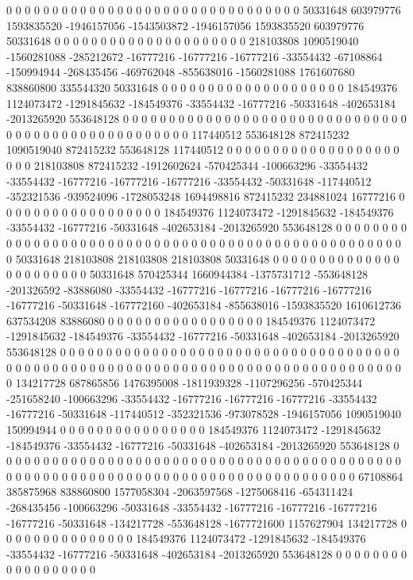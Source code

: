 0 0 0 0 0 0 0 0 0 0 0 0 0 0 0 0 0 0 0 0 0 0 0 0 0 0 0 0 0 0 0 0 50331648 603979776 1593835520 -1946157056 -1543503872 -1946157056 1593835520 603979776 50331648 0 0 0 0 0 0 0 0 0 0 0 0 0 0 0 0 0 0 0 0 0 218103808 1090519040 -1560281088 -285212672 -16777216 -16777216 -16777216 -33554432 -67108864 -150994944 -268435456 -469762048 -855638016 -1560281088 1761607680 838860800 335544320 50331648 0 0 0 0 0 0 0 0 0 0 0 0 0 0 0 0 0 0 0 0 184549376 1124073472 -1291845632 -184549376 -33554432 -16777216 -50331648 -402653184 -2013265920 553648128 0 0 0 0 0 0 0 0 0 0 0 0 0 0 0 0 0 0
0 0 0 0 0 0 0 0 0 0 0 0 0 0 0 0 0 0 0 0 0 0 0 0 0 0 0 0 0 0 0 0 0 117440512 553648128 872415232 1090519040 872415232 553648128 117440512 0 0 0 0 0 0 0 0 0 0 0 0 0 0 0 0 0 0 0 0 0 0 218103808 872415232 -1912602624 -570425344 -100663296 -33554432 -33554432 -16777216 -16777216 -16777216 -33554432 -50331648 -117440512 -352321536 -939524096 -1728053248 1694498816 872415232 234881024 16777216 0 0 0 0 0 0 0 0 0 0 0 0 0 0 0 0 0 0 184549376 1124073472 -1291845632 -184549376 -33554432 -16777216 -50331648 -402653184 -2013265920 553648128 0 0 0 0 0 0 0 0 0 0 0 0 0 0 0 0 0 0
0 0 0 0 0 0 0 0 0 0 0 0 0 0 0 0 0 0 0 0 0 0 0 0 0 0 0 0 0 0 0 0 0 0 50331648 218103808 218103808 218103808 50331648 0 0 0 0 0 0 0 0 0 0 0 0 0 0 0 0 0 0 0 0 0 0 0 50331648 570425344 1660944384 -1375731712 -553648128 -201326592 -83886080 -33554432 -16777216 -16777216 -16777216 -16777216 -16777216 -50331648 -167772160 -402653184 -855638016 -1593835520 1610612736 637534208 83886080 0 0 0 0 0 0 0 0 0 0 0 0 0 0 0 0 0 184549376 1124073472 -1291845632 -184549376 -33554432 -16777216 -50331648 -402653184 -2013265920 553648128 0 0 0 0 0 0 0 0 0 0 0 0 0 0 0 0 0 0
0 0 0 0 0 0 0 0 0 0 0 0 0 0 0 0 0 0 0 0 0 0 0 0 0 0 0 0 0 0 0 0 0 0 0 0 0 0 0 0 0 0 0 0 0 0 0 0 0 0 0 0 0 0 0 0 0 0 0 0 0 0 0 134217728 687865856 1476395008 -1811939328 -1107296256 -570425344 -251658240 -100663296 -33554432 -16777216 -16777216 -16777216 -33554432 -16777216 -50331648 -117440512 -352321536 -973078528 -1946157056 1090519040 150994944 0 0 0 0 0 0 0 0 0 0 0 0 0 0 0 0 184549376 1124073472 -1291845632 -184549376 -33554432 -16777216 -50331648 -402653184 -2013265920 553648128 0 0 0 0 0 0 0 0 0 0 0 0 0 0 0 0 0 0
0 0 0 0 0 0 0 0 0 0 0 0 0 0 0 0 0 0 0 0 0 0 0 0 0 0 0 0 0 0 0 0 0 0 0 0 0 0 0 0 0 0 0 0 0 0 0 0 0 0 0 0 0 0 0 0 0 0 0 0 0 0 0 0 67108864 385875968 838860800 1577058304 -2063597568 -1275068416 -654311424 -268435456 -100663296 -50331648 -33554432 -16777216 -16777216 -16777216 -16777216 -50331648 -134217728 -553648128 -1677721600 1157627904 134217728 0 0 0 0 0 0 0 0 0 0 0 0 0 0 0 184549376 1124073472 -1291845632 -184549376 -33554432 -16777216 -50331648 -402653184 -2013265920 553648128 0 0 0 0 0 0 0 0 0 0 0 0 0 0 0 0 0 0
